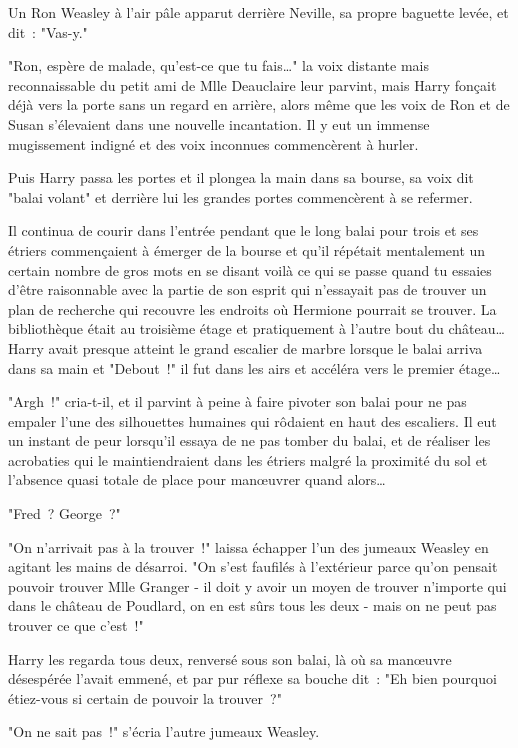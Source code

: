 Un Ron Weasley à l'air pâle apparut derrière Neville, sa propre baguette levée, et dit~: "Vas-y."

"Ron, espère de malade, qu'est-ce que tu fais…" la voix distante mais reconnaissable du petit ami de Mlle Deauclaire leur parvint, mais Harry fonçait déjà vers la porte sans un regard en arrière, alors même que les voix de Ron et de Susan s'élevaient dans une nouvelle incantation. Il y eut un immense mugissement indigné et des voix inconnues commencèrent à hurler.

Puis Harry passa les portes et il plongea la main dans sa bourse, sa voix dit "balai volant" et derrière lui les grandes portes commencèrent à se refermer.

Il continua de courir dans l'entrée pendant que le long balai pour trois et ses étriers commençaient à émerger de la bourse et qu'il répétait mentalement un certain nombre de gros mots en se disant voilà ce qui se passe quand tu essaies d'être raisonnable avec la partie de son esprit qui n'essayait pas de trouver un plan de recherche qui recouvre les endroits où Hermione pourrait se trouver. La bibliothèque était au troisième étage et pratiquement à l'autre bout du château… Harry avait presque atteint le grand escalier de marbre lorsque le balai arriva dans sa main et "Debout~!" il fut dans les airs et accéléra vers le premier étage…

"Argh~!" cria-t-il, et il parvint à peine à faire pivoter son balai pour ne pas empaler l'une des silhouettes humaines qui rôdaient en haut des escaliers. Il eut un instant de peur lorsqu'il essaya de ne pas tomber du balai, et de réaliser les acrobaties qui le maintiendraient dans les étriers malgré la proximité du sol et l'absence quasi totale de place pour manœuvrer quand alors…

"Fred~? George~?"

"On n'arrivait pas à la trouver~!" laissa échapper l'un des jumeaux Weasley en agitant les mains de désarroi. "On s'est faufilés à l'extérieur parce qu'on pensait pouvoir trouver Mlle Granger - il doit y avoir un moyen de trouver n'importe qui dans le château de Poudlard, on en est sûrs tous les deux - mais on ne peut pas trouver ce que c'est~!"

Harry les regarda tous deux, renversé sous son balai, là où sa manœuvre désespérée l'avait emmené, et par pur réflexe sa bouche dit~: "Eh bien pourquoi étiez-vous si certain de pouvoir la trouver~?"

"On ne sait pas~!" s'écria l'autre jumeaux Weasley.

